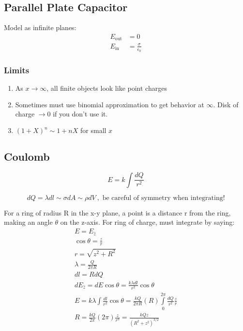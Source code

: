 \documentclass[10pt,a4paper]{article}
\begin{document}
\subsection{Parallel Plate Capacitor}
Model as infinite planes: 
\begin{align}
 E_{\textrm{out}}  &= 0\\
 E_{\textrm{in}} &= \frac{\sigma}{\epsilon_0}
\end{align}

\subsubsection{Limits}
\begin{enumerate}
    \item As $x \rightarrow \infty$, all finite objects look like point charges
    \item Sometimes must use binomial approximation to get behavior at $\infty$. Disk of charge $\rightarrow 0$ if you don't use it.
    \item $(1+X)^n \sim 1+ nX$ for small $x$
\end{enumerate}

\subsection{Coulomb}
\begin{equation}
 E = k \int \frac{dQ}{r^2} 
\end{equation}

\begin{equation}
  dQ = \lambda dl \sim \sigma dA \sim \rho dV~, \textrm{ be careful of symmetry when integrating!}
\end{equation}

For a ring of radius R in the x-y plane, a point is a distance r from the ring, making an angle $\theta$ on the z-axis. For ring of charge, must integrate by saying:
\begin{align}
 E = E_{\hat{z}}\\
 \cos \theta = \frac{z}{r}\\
 r = \sqrt{z^2 + R^2}\\
 \lambda = \frac{Q}{2 \pi R}\\
dl = R dQ\\
dE_{\hat{z}} = dE\cos \theta = \frac{k \lambda dl}{r^2}\cos\theta\\
E = k \lambda \int \frac{dl}{r^2}\cos \theta = \frac{kQ}{2 \pi R}(R) \int \limits_0^{2\pi} \frac{dQ}{r^2}\frac{z}{r}\\
R = \frac{kQ}{2\pi}(2\pi) \frac{z}{r^3} = \frac{kQz}{(R^2 + z^2)^{3/2}}
\end{align}
\end{document}
